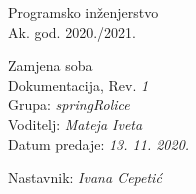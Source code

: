 \documentclass[12pt]{report}
\begin{document}
 
	
	
	
	\begin{titlepage}
		\begin{center}
			\LARGE Programsko inženjerstvo\\
			\large Ak. god. 2020./2021.\\
			
			
			\huge Zamjena soba\\
			\Large Dokumentacija, Rev. \textit{1}\\
			
			\normalsize
			Grupa: \textit{springRolice}\\
			Voditelj: \textit{Mateja Iveta}\\
			
			
			Datum predaje: \textit{13. 11. 2020.}\\
			
			
			Nastavnik: \textit{Ivana Cepetić}\\
			
		\end{center}
		
		
	\end{titlepage}
	
	
	\tableofcontents
	
	
	
	
	
	
	
    
	
	
	
	\begingroup
	\renewcommand*\listfigurename{Indeks slika i dijagrama}
	\listoffigures
	\endgroup
	
	
	
	\eject 
	
	
	
\end{document}
